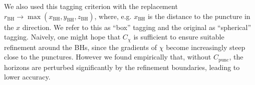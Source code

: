 We also used this tagging criterion with the replacement
$r_{\mathrm{BH}}\to
\max(x_{\mathrm{BH}},y_{\mathrm{BH}},z_{\mathrm{BH}})$, where,
e.g. $x_{\mathrm{BH}}$ is the distance to the puncture in the $x$
direction. We refer to this as ``box'' tagging and the original as
``spherical'' tagging. Naively, one might hope that $C_{\chi}$ is
sufficient to ensure suitable refinement around the BHs, since the
gradients of $\chi$ become increasingly steep close to the
punctures. However we found empirically that, without
$C_{\text{punc}}$, the horizons are perturbed significantly by the
refinement boundaries, leading to lower accuracy.
